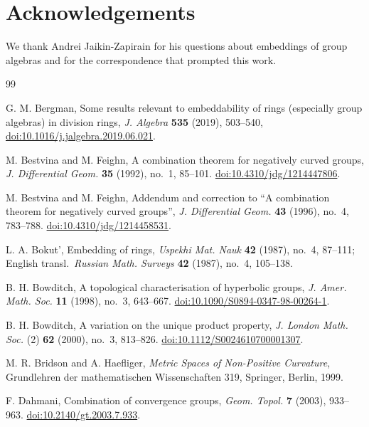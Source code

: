 \documentclass[11pt,a4paper]{article}
\numberwithin{equation}{section}
\begin{document}
\section*{Acknowledgements}

We thank Andrei Jaikin-Zapirain for his questions about embeddings of
group algebras and for the correspondence that prompted this work.

\begin{thebibliography}{99}

G. M. Bergman, Some results relevant to embeddability of rings (especially group
algebras) in division rings, \emph{J. Algebra} \textbf{535} (2019), 503--540,
\href{https://doi.org/10.1016/j.jalgebra.2019.06.021}{doi:10.1016/j.jalgebra.2019.06.021}.

M. Bestvina and M. Feighn, A combination theorem for negatively curved groups,
\emph{J. Differential Geom.} \textbf{35} (1992), no.~1, 85--101.
\href{https://doi.org/10.4310/jdg/1214447806}{doi:10.4310/jdg/1214447806}.

M. Bestvina and M. Feighn, Addendum and correction to ``A combination theorem
for negatively curved groups'', \emph{J. Differential Geom.} \textbf{43}
(1996), no.~4, 783--788.
\href{https://doi.org/10.4310/jdg/1214458531}{doi:10.4310/jdg/1214458531}.

L. A. Bokut', Embedding of rings, \emph{Uspekhi Mat. Nauk} \textbf{42}
(1987), no.~4, 87--111; English transl.\ \emph{Russian Math. Surveys}
\textbf{42} (1987), no.~4, 105--138.

B. H. Bowditch, A topological characterisation of hyperbolic groups,
\emph{J. Amer. Math. Soc.} \textbf{11} (1998), no.~3, 643--667.
\href{https://doi.org/10.1090/S0894-0347-98-00264-1}{doi:10.1090/S0894-0347-98-00264-1}.

B. H. Bowditch, A variation on the unique product property,
\emph{J. London Math. Soc.} (2) \textbf{62} (2000), no.~3, 813--826.
\href{https://doi.org/10.1112/S0024610700001307}{doi:10.1112/S0024610700001307}.

M. R. Bridson and A. Haefliger, \emph{Metric Spaces of Non-Positive
Curvature}, Grundlehren der mathematischen Wissenschaften 319, Springer,
Berlin, 1999.

F. Dahmani, Combination of convergence groups, \emph{Geom. Topol.}
\textbf{7} (2003), 933--963.
\href{https://doi.org/10.2140/gt.2003.7.933}{doi:10.2140/gt.2003.7.933}.


\end{thebibliography}
\end{document}
